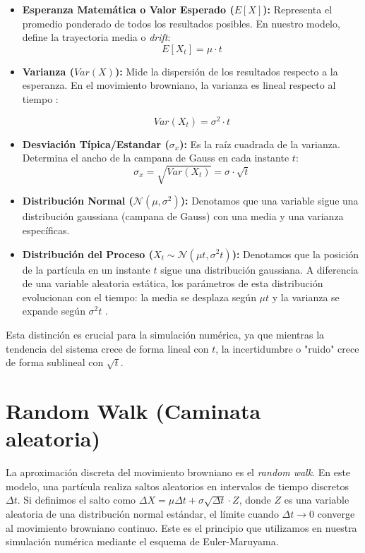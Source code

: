 \documentclass[11pt]{article}
\newcommand{\comillas}[1]{"#1"} %
\newcommand{\mult}[0]{\!\cdot\!} %
\begin{document}
		\begin{itemize}
			\item \textbf{Esperanza Matemática o Valor Esperado ($E[X]$):} Representa el promedio ponderado de todos los resultados posibles. En nuestro modelo, define la trayectoria media o \textit{drift}:
			\begin{equation}
				E[X_t] = \mu \mult t
			\end{equation}
			
			\item \textbf{Varianza ($Var(X)$):} Mide la dispersión de los resultados respecto a la esperanza. En el movimiento browniano, la varianza es lineal respecto al tiempo \hyperref[oksendal2003stochastic]{\cite{oksendal2003stochastic}}:
			
			\begin{equation}
				Var(X_t) = \sigma^2 \mult t
			\end{equation}
			
			\item \textbf{Desviación Típica/Estandar ($\sigma_x$):} Es la raíz cuadrada de la varianza. Determina el ancho de la campana de Gauss en cada instante $t$:
			\begin{equation}
				\sigma_x = \sqrt{Var(X_t)} = \sigma \mult \sqrt{t}
			\end{equation}
			
			\item \textbf{Distribución Normal ($\mathcal{N}(\mu, \sigma^2)$):} Denotamos que una variable sigue una distribución gaussiana (campana de Gauss) con una media y una varianza específicas.
			
			\item \textbf{Distribución del Proceso ($X_t \sim \mathcal{N}(\mu t, \sigma^2 t)$):} Denotamos que la posición de la partícula en un instante $t$ sigue una distribución gaussiana. A diferencia de una variable aleatoria estática, los parámetros de esta distribución evolucionan con el tiempo: la media se desplaza según $\mu t$ y la varianza se expande según $\sigma^2 t$ \cite{oksendal2003stochastic}.
		\end{itemize}
		
		Esta distinción es crucial para la simulación numérica, ya que mientras la tendencia del sistema crece de forma lineal con $t$, la incertidumbre o \comillas{ruido} crece de forma sublineal con $\sqrt{t}$.
		
	\section{Random Walk (Caminata aleatoria)}	
		La aproximación discreta del movimiento browniano es el \textit{random walk}\cite{shreve2005stochastic}. En este modelo, una partícula realiza saltos aleatorios en intervalos de tiempo discretos $\Delta t$. Si definimos el salto como $\Delta X = \mu\Delta t + \sigma \sqrt{\Delta t} \mult Z$, donde $Z $ es una variable aleatoria de una distribución normal estándar, el límite cuando $\Delta t \to 0$ converge al movimiento browniano continuo. Este es el principio que utilizamos en nuestra simulación numérica mediante el esquema de Euler-Maruyama.
		
\end{document}
